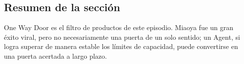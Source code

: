 \subsection{Resumen de la sección}

One Way Door es el filtro de productos de este episodio. Miaoya fue un gran éxito viral, pero no necesariamente una puerta de un solo sentido; un Agent, si logra superar de manera estable los límites de capacidad, puede convertirse en una puerta acertada a largo plazo.
